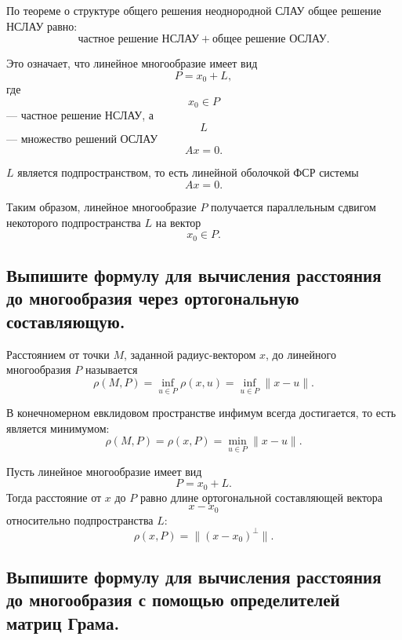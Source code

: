 \begin{remark}
    По теореме о структуре общего решения неоднородной СЛАУ общее решение НСЛАУ равно:
    \[
        \text{частное решение НСЛАУ}
        +
        \text{общее решение ОСЛАУ}.
    \]
    
    Это означает, что линейное многообразие имеет вид
    \[
        P = x_0 + L,
    \]
    где
    \[
        x_0 \in P
    \]
    --- частное решение НСЛАУ, а
    \[
        L
    \]
    --- множество решений ОСЛАУ
    \[
        Ax = 0.
    \]
\end{remark}

\begin{remark}
    $L$ является подпространством, то есть линейной оболочкой ФСР системы
    \[
        Ax = 0.
    \]
    
    Таким образом, линейное многообразие $P$ получается параллельным сдвигом некоторого подпространства $L$ на вектор
    \[
        x_0 \in P.
    \]
\end{remark}

\subsection{Выпишите формулу для вычисления расстояния до многообразия через ортогональную составляющую.}

\begin{definition}
    Расстоянием от точки $M$, заданной радиус-вектором $x$, до линейного многообразия $P$ называется
    \[
        \rho(M, P)
        =
        \inf_{u \in P}\rho(x, u)
        =
        \inf_{u \in P}\|x-u\|.
    \]
\end{definition}

\begin{remark}
    В конечномерном евклидовом пространстве инфимум всегда достигается, то есть является минимумом:
    \[
        \rho(M, P)
        =
        \rho(x, P)
        =
        \min_{u \in P}\|x-u\|.
    \]
\end{remark}

\begin{remark}
    Пусть линейное многообразие имеет вид
    \[
        P = x_0 + L.
    \]
    Тогда расстояние от $x$ до $P$ равно длине ортогональной составляющей вектора
    \[
        x - x_0
    \]
    относительно подпространства $L$:
    \[
        \rho(x,P)
        =
        \|(x-x_0)^{\perp}\|.
    \]
\end{remark}

\subsection{Выпишите формулу для вычисления расстояния до многообразия с помощью определителей матриц Грама.}

